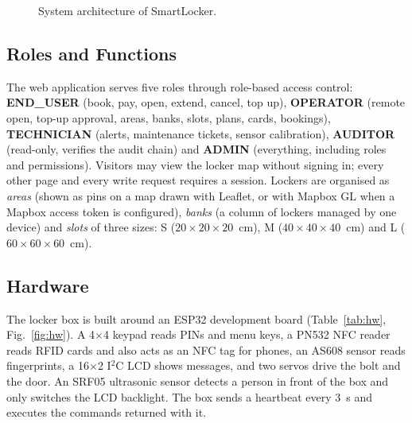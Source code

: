 \documentclass[conference, onecolumn]{IEEEtran}
\begin{document}
\begin{figure}[H]
\caption{System architecture of SmartLocker.}
\label{fig:arch}
\end{figure}

\subsection{Roles and Functions}

The web application serves five roles through role-based access control: \textbf{END\_USER} (book, pay, open, extend,
cancel, top up), \textbf{OPERATOR} (remote open, top-up approval, areas, banks, slots, plans, cards, bookings),
\textbf{TECHNICIAN} (alerts, maintenance tickets, sensor calibration), \textbf{AUDITOR} (read-only, verifies the audit
chain) and \textbf{ADMIN} (everything, including roles and permissions). Visitors may view the locker map without signing
in; every other page and every write request requires a session. Lockers are organised as \emph{areas} (shown as pins
on a map drawn with Leaflet, or with Mapbox GL when a Mapbox access token is configured), \emph{banks} (a column of lockers managed by one device) and \emph{slots} of three sizes: S
($20\times20\times20$~cm), M ($40\times40\times40$~cm) and L ($60\times60\times60$~cm).

\subsection{Hardware}

The locker box is built around an ESP32 development board (Table~\ref{tab:hw}, Fig.~\ref{fig:hw}). A 4$\times$4 keypad
reads PINs and menu keys, a PN532 NFC reader reads RFID cards and also acts as an NFC tag for phones, an AS608 sensor reads fingerprints, a 16$\times$2 I$^2$C LCD
shows messages, and two servos drive the bolt and the door. An SRF05 ultrasonic sensor detects a person in front of the
box and only switches the LCD backlight. The box sends a heartbeat every 3~s and executes the commands returned with it.
\end{document}
